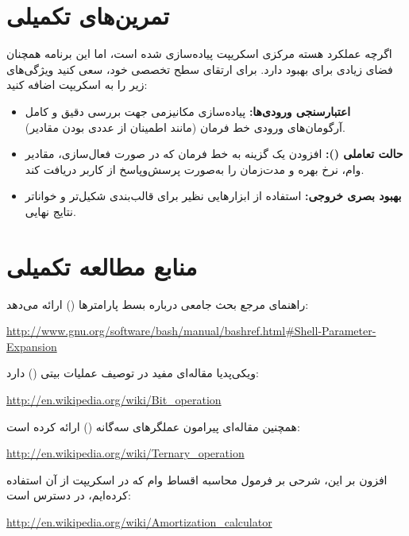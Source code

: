 \section{تمرین‌های تکمیلی}

اگرچه عملکرد هسته مرکزی اسکریپت  پیاده‌سازی شده است، اما این برنامه همچنان فضای زیادی برای بهبود دارد. برای ارتقای سطح تخصصی خود، سعی کنید ویژگی‌های زیر را به اسکریپت اضافه کنید:

\begin{itemize}
  \item \textbf{اعتبارسنجی ورودی‌ها:} پیاده‌سازی مکانیزمی جهت بررسی دقیق و کامل آرگومان‌های ورودی خط فرمان (مانند اطمینان از عددی بودن مقادیر).
  \item \textbf{حالت تعاملی ():} افزودن یک گزینه به خط فرمان که در صورت فعال‌سازی، مقادیر وام، نرخ بهره و مدت‌زمان را به‌صورت پرسش‌وپاسخ از کاربر دریافت کند.
  \item \textbf{بهبود بصری خروجی:} استفاده از ابزارهایی نظیر  برای قالب‌بندی شکیل‌تر و خواناتر نتایج نهایی.
\end{itemize}

\section{منابع مطالعه تکمیلی}

راهنمای مرجع  بحث جامعی درباره بسط پارامترها () ارائه می‌دهد:

\begin{latin}
\url{http://www.gnu.org/software/bash/manual/bashref.html#Shell-Parameter-Expansion}
\end{latin}

ویکی‌پدیا مقاله‌ای مفید در توصیف عملیات بیتی () دارد:

\begin{latin}
\url{http://en.wikipedia.org/wiki/Bit_operation}
\end{latin}

همچنین مقاله‌ای پیرامون عملگرهای سه‌گانه () ارائه کرده است:

\begin{latin}
\url{http://en.wikipedia.org/wiki/Ternary_operation}
\end{latin}

افزون بر این، شرحی بر فرمول محاسبه اقساط وام که در اسکریپت  از آن استفاده کرده‌ایم، در دسترس است:

\begin{latin}
\url{http://en.wikipedia.org/wiki/Amortization_calculator}
\end{latin}